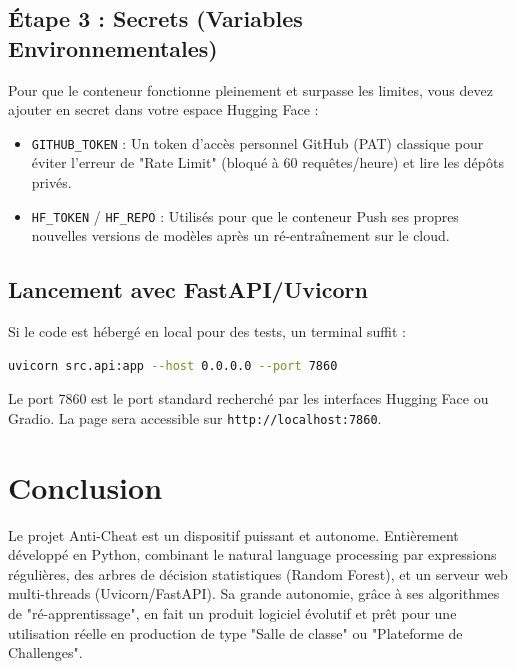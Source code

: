 \documentclass[a4paper,11pt]{article}
\begin{document}
\subsection{Étape 3 : Secrets (Variables Environnementales)}
Pour que le conteneur fonctionne pleinement et surpasse les limites, vous devez ajouter en secret dans votre espace Hugging Face :
\begin{itemize}
    \item \texttt{GITHUB\_TOKEN} : Un token d'accès personnel GitHub (PAT) classique pour éviter l'erreur de "Rate Limit" (bloqué à 60 requêtes/heure) et lire les dépôts privés.
    \item \texttt{HF\_TOKEN} / \texttt{HF\_REPO} : Utilisés pour que le conteneur Push ses propres nouvelles versions de modèles après un ré-entraînement sur le cloud.
\end{itemize}

\subsection{Lancement avec FastAPI/Uvicorn}
Si le code est hébergé en local pour des tests, un terminal suffit :
\begin{lstlisting}[language=bash]
uvicorn src.api:app --host 0.0.0.0 --port 7860
\end{lstlisting}
Le port 7860 est le port standard recherché par les interfaces Hugging Face ou Gradio. La page sera accessible sur \texttt{http://localhost:7860}.


\section{Conclusion}

Le projet Anti-Cheat est un dispositif puissant et autonome. Entièrement développé en Python, combinant le natural language processing par expressions régulières, des arbres de décision statistiques (Random Forest), et un serveur web multi-threads (Uvicorn/FastAPI). Sa grande autonomie, grâce à ses algorithmes de "ré-apprentissage", en fait un produit logiciel évolutif et prêt pour une utilisation réelle en production de type "Salle de classe" ou "Plateforme de Challenges".
\end{document}
